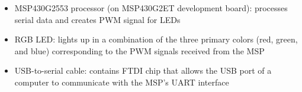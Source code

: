 \begin{itemize}
    \item MSP430G2553 processor (on MSP430G2ET development board): processes serial data and creates PWM signal for LEDs
    \item RGB LED: lights up in a combination of the three primary colors (red, green, and blue) corresponding to the PWM signals received from the MSP
    \item USB-to-serial cable: contains FTDI chip that allows the USB port of a computer to communicate with the MSP's UART interface
\end{itemize}
